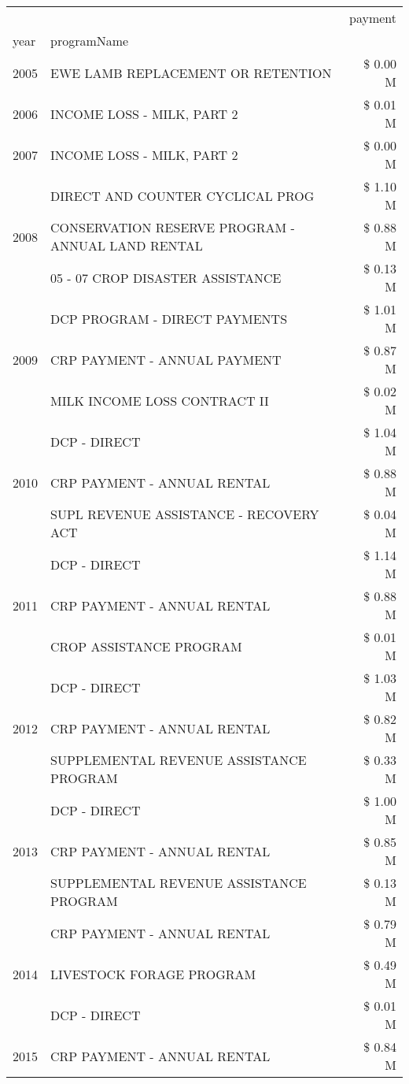 \begin{tabular}{llr}
\toprule
 &  & payment \\
year & programName &  \\
\midrule
2005 & EWE LAMB REPLACEMENT OR RETENTION & \$ 0.00 M \\
\cline{1-3}
2006 & INCOME LOSS - MILK, PART 2 & \$ 0.01 M \\
\cline{1-3}
2007 & INCOME LOSS - MILK, PART 2 & \$ 0.00 M \\
\cline{1-3}
\multirow[t]{3}{*}{2008} & DIRECT AND COUNTER CYCLICAL PROG & \$ 1.10 M \\
 & CONSERVATION RESERVE PROGRAM - ANNUAL LAND RENTAL & \$ 0.88 M \\
 & 05 - 07 CROP DISASTER ASSISTANCE & \$ 0.13 M \\
\cline{1-3}
\multirow[t]{3}{*}{2009} & DCP PROGRAM - DIRECT PAYMENTS & \$ 1.01 M \\
 & CRP PAYMENT - ANNUAL PAYMENT & \$ 0.87 M \\
 & MILK INCOME LOSS CONTRACT II & \$ 0.02 M \\
\cline{1-3}
\multirow[t]{3}{*}{2010} & DCP - DIRECT & \$ 1.04 M \\
 & CRP PAYMENT - ANNUAL RENTAL & \$ 0.88 M \\
 & SUPL REVENUE ASSISTANCE - RECOVERY ACT & \$ 0.04 M \\
\cline{1-3}
\multirow[t]{3}{*}{2011} & DCP - DIRECT & \$ 1.14 M \\
 & CRP PAYMENT - ANNUAL RENTAL & \$ 0.88 M \\
 & CROP ASSISTANCE PROGRAM & \$ 0.01 M \\
\cline{1-3}
\multirow[t]{3}{*}{2012} & DCP - DIRECT & \$ 1.03 M \\
 & CRP PAYMENT - ANNUAL RENTAL & \$ 0.82 M \\
 & SUPPLEMENTAL REVENUE ASSISTANCE PROGRAM & \$ 0.33 M \\
\cline{1-3}
\multirow[t]{3}{*}{2013} & DCP - DIRECT & \$ 1.00 M \\
 & CRP PAYMENT - ANNUAL RENTAL & \$ 0.85 M \\
 & SUPPLEMENTAL REVENUE ASSISTANCE PROGRAM & \$ 0.13 M \\
\cline{1-3}
\multirow[t]{3}{*}{2014} & CRP PAYMENT - ANNUAL RENTAL & \$ 0.79 M \\
 & LIVESTOCK FORAGE PROGRAM & \$ 0.49 M \\
 & DCP - DIRECT & \$ 0.01 M \\
\cline{1-3}
\multirow[t]{3}{*}{2015} & CRP PAYMENT - ANNUAL RENTAL & \$ 0.84 M \\

\end{tabular}
